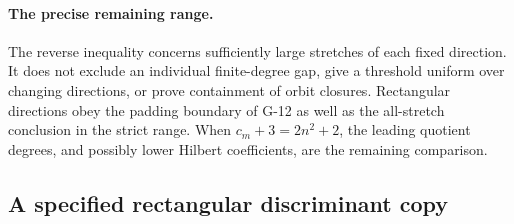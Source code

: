 \paragraph{The precise remaining range.}
The reverse inequality concerns sufficiently large stretches of
each fixed direction. It does not exclude an individual
finite-degree gap, give a threshold uniform over changing
directions, or prove containment of orbit closures. Rectangular
directions obey the padding boundary of G-12 as well as the
all-stretch conclusion in the strict range. When
$c_m+3=2n^2+2$, the leading quotient degrees, and
possibly lower Hilbert coefficients, are the remaining comparison.


\subsection{A specified rectangular discriminant copy}

